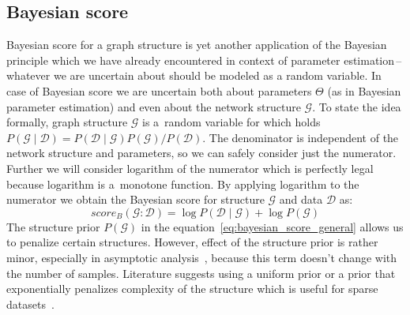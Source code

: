 \documentclass[english,cover]{fitthesis} %
\begin{document}
\subsection{Bayesian score}
Bayesian score for a graph structure is yet another application of the Bayesian principle which we have already encountered in context of parameter estimation\,--\,whatever we are uncertain about should be modeled as a random variable. In case of Bayesian score we are uncertain both about parameters $\Theta$ (as in Bayesian parameter estimation) and even about the network structure $\mathcal{G}$. To state the idea formally, graph structure $\mathcal{G}$ is a~random variable for which holds $P(\mathcal{G} \mid \mathcal{D}) = P(\mathcal{D} \mid \mathcal{G}) P(\mathcal{G}) / P(\mathcal{D})$. The denominator is independent of the network structure and parameters, so we can safely consider just the numerator. Further we will consider logarithm of the numerator which is perfectly legal because logarithm is a~monotone function. By applying logarithm to the numerator we obtain the Bayesian score for structure $\mathcal{G}$ and data $\mathcal{D}$ as:
\begin{equation}\label{eq:bayesian_score_general}
    score_B(\mathcal{G} : \mathcal{D}) = \log P(\mathcal{D} \mid \mathcal{G}) + \log P(\mathcal{G})
\end{equation}
The structure prior $P(\mathcal{G})$ in the equation~\eqref{eq:bayesian_score_general} allows us to penalize certain structures. However, effect of the structure prior is rather minor, especially in asymptotic analysis~\cite[p.~804]{pgm}, because this term doesn't change with the number of samples. Literature suggests using a uniform prior or a prior that exponentially penalizes complexity of the structure which is useful for sparse datasets~\cite{pgm}.
\end{document}
